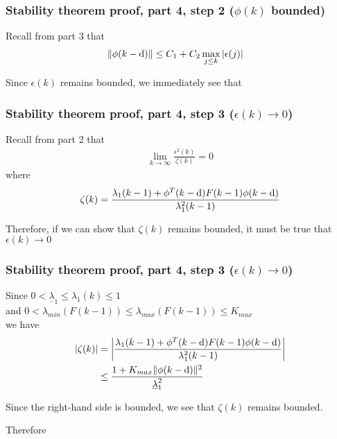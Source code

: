 \begin{frame}
    \frametitle{Stability theorem proof, part 4, step 2 ($\phi(k)$ bounded)}

    Recall from part 3 that
    \begin{align*}
        \| \phi(k-\textrm{d}) \| & \leq C_1 + C_2 \max_{j \leq k} |\epsilon(j)|
    \end{align*}
    \pause
    
    Since $\epsilon(k)$ remains bounded, we immediately see that

\end{frame}

\begin{frame}
    \frametitle{Stability theorem proof, part 4, step 3 ($\epsilon(k) \longrightarrow 0$)}

    Recall from part 2 that
    \begin{align*}
        \lim_{k \rightarrow \infty} \frac{ \epsilon^2(k) }{ \zeta(k) } = 0
    \end{align*}
    where
    \begin{align*}
        \zeta(k) = \frac{\lambda_1(k-1) + \phi^T(k-\textrm{d}) F(k-1) \phi(k-\textrm{d})}{\lambda_1^2(k-1)}
    \end{align*}
    \pause
    
    Therefore, if we can show that $\zeta(k)$ remains bounded, it must be true that $\epsilon(k) \longrightarrow 0$

\end{frame}

\begin{frame}
    \frametitle{Stability theorem proof, part 4, step 3 ($\epsilon(k) \longrightarrow 0$)}

    Since $0 < \underline{\lambda}_1 \leq \lambda_1(k) \leq 1$ \\
    and $0 < \lambda_{min}(F(k-1)) \leq \lambda_{max}(F(k-1)) \leq K_{max}$ \\
    we have
    \begin{align*}
        |\zeta(k)| & = \left| \frac{\lambda_1(k-1) + \phi^T(k-\textrm{d}) F(k-1) \phi(k-\textrm{d})}{\lambda_1^2(k-1)} \right| \\
        & \leq \frac{ 1 + K_{max} \| \phi(k-\textrm{d}) \|^2 }{ \underline{\lambda}_1^2 }
    \end{align*}
    \pause
    
    Since the right-hand side is bounded, we see that $\zeta(k)$ remains bounded.
    \pause
    
    Therefore

\end{frame}




